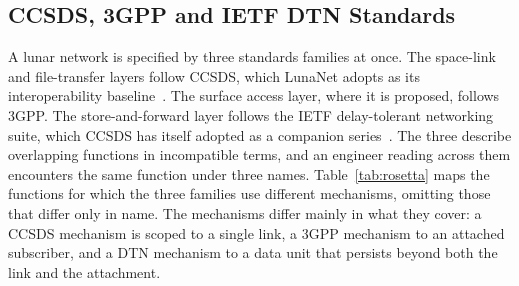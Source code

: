 \documentclass{IEEEoj}
\begin{document}
\subsection{CCSDS, 3GPP and IETF DTN Standards}
A lunar network is specified by three standards families at once. The space-link and file-transfer layers follow CCSDS, which LunaNet adopts as its interoperability baseline~\cite{lnis_v5,ccsds_lunar_standards}. The surface access layer, where it is proposed, follows 3GPP. The store-and-forward layer follows the IETF delay-tolerant networking suite, which CCSDS has itself adopted as a companion series~\cite{ccsds_bp,ccsds_ltp}. The three describe overlapping functions in incompatible terms, and an engineer reading across them encounters the same function under three names. Table~\ref{tab:rosetta} maps the functions for which the three families use different mechanisms, omitting those that differ only in name. The mechanisms differ mainly in what they cover: a CCSDS mechanism is scoped to a single link, a 3GPP mechanism to an attached subscriber, and a DTN mechanism to a data unit that persists beyond both the link and the attachment.
\end{document}
